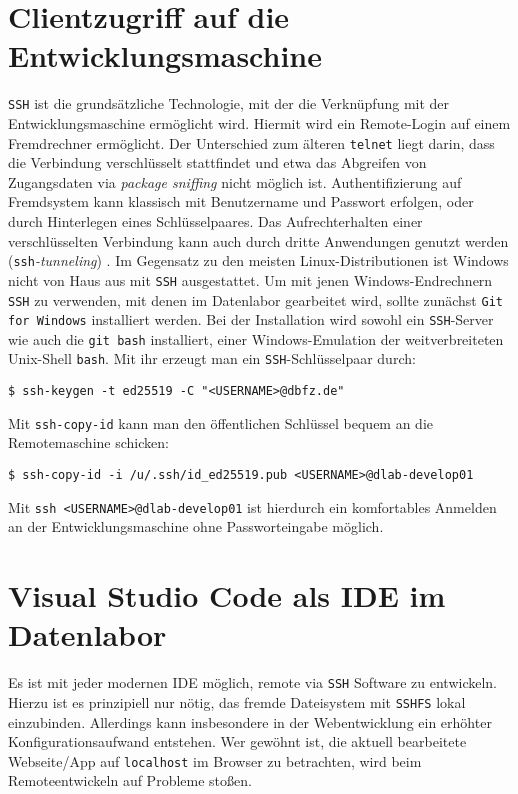 \section{Clientzugriff auf die Entwicklungsmaschine}
\texttt{SSH} ist die grundsätzliche Technologie, mit der die Verknüpfung mit der Entwicklungsmaschine ermöglicht wird.
Hiermit wird ein Remote-Login auf einem Fremdrechner ermöglicht.
Der Unterschied zum älteren \texttt{telnet} liegt darin, dass die Verbindung verschlüsselt stattfindet und etwa das Abgreifen von Zugangsdaten via \textit{package sniffing} nicht möglich ist.
Authentifizierung auf Fremdsystem kann klassisch mit Benutzername und Passwort erfolgen, oder durch Hinterlegen eines Schlüsselpaares.
Das Aufrechterhalten einer verschlüsselten Verbindung kann auch durch dritte Anwendungen genutzt werden (\texttt{ssh}\textit{-tunneling}) \cite[608-611]{PetersonNetze}.
Im Gegensatz zu den meisten Linux-Distributionen ist Windows nicht von Haus aus mit \texttt{SSH} ausgestattet.
Um mit jenen  Windows-Endrechnern \texttt{SSH} zu verwenden, mit denen im Datenlabor gearbeitet wird, sollte zunächst \texttt{Git for Windows} installiert werden.
Bei der Installation wird sowohl ein \texttt{SSH}-Server wie auch die \texttt{git bash} installiert, einer Windows-Emulation der weitverbreiteten Unix-Shell \texttt{bash}.
Mit ihr erzeugt man ein \texttt{SSH}-Schlüsselpaar durch:
\begin{verbatim}
$ ssh-keygen -t ed25519 -C "<USERNAME>@dbfz.de"
\end{verbatim}
Mit \texttt{ssh-copy-id} kann man den öffentlichen Schlüssel bequem an die Remotemaschine schicken:
\begin{verbatim}
$ ssh-copy-id -i /u/.ssh/id_ed25519.pub <USERNAME>@dlab-develop01
\end{verbatim}
Mit \texttt{ssh <USERNAME>@dlab-develop01} ist hierdurch ein komfortables Anmelden an der Entwicklungsmaschine ohne Passworteingabe möglich.
\\


\section{Visual Studio Code als IDE im Datenlabor} \label{VSCoderemote}
Es ist mit jeder modernen \acs{IDE} möglich, remote via \texttt{SSH} Software zu entwickeln.
Hierzu ist es prinzipiell nur nötig, das fremde Dateisystem mit \texttt{SSHFS} lokal einzubinden.
Allerdings kann insbesondere in der Webentwicklung ein erhöhter Konfigurationsaufwand entstehen.
Wer gewöhnt ist, die aktuell bearbeitete Webseite/App auf \texttt{localhost} im Browser zu betrachten, wird beim Remoteentwickeln auf Probleme stoßen.

